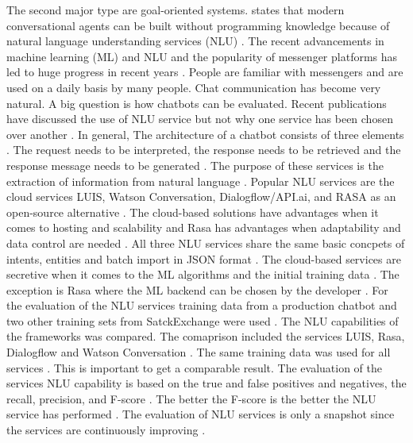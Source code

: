 The second major type are goal-oriented systems.
\citet{braunEvaluatingNLU} states that modern conversational agents can be built without programming 
knowledge because of natural language understanding services (NLU) \cite{braunEvaluatingNLU}. 
The recent advancements in machine learning (ML) and NLU and the popularity of messenger platforms 
has led to huge progress in recent years \cite{braunEvaluatingNLU}. 
People are familiar with messengers and are used on a daily basis by many people.
Chat communication has become very natural.
A big question is how chatbots can be evaluated.
Recent publications have discussed the use of NLU service but not why 
one service has been chosen over another \cite{braunEvaluatingNLU}.
In general, The architecture of a chatbot consists of three elements \cite{braunEvaluatingNLU}. 
The request needs to be interpreted, the response needs to be retrieved and the response message
needs to be generated \cite{braunEvaluatingNLU}. 
The purpose of these services is the extraction of information from natural language \cite{braunEvaluatingNLU}. 
Popular NLU services are the cloud services LUIS, Watson Conversation, Dialogflow/API.ai, and RASA as an open-source alternative \cite{braunEvaluatingNLU}. 
The cloud-based solutions have advantages when it comes to hosting and scalability and Rasa has advantages
when adaptability and data control are needed \cite{braunEvaluatingNLU}. 
All three NLU services share the same basic concpets of intents, entities and batch import in JSON format \cite{braunEvaluatingNLU}.
The cloud-based services are secretive when it comes to the ML algorithms and the initial training data \cite{braunEvaluatingNLU}. 
The exception is Rasa where the ML backend can be chosen by the developer \cite{braunEvaluatingNLU}. 
For the evaluation of the NLU services training data from a production chatbot and two other training sets 
from SatckExchange were used \cite{braunEvaluatingNLU}. 
The NLU capabilities of the frameworks was compared.
The comaprison included the services LUIS, Rasa, Dialogflow and Watson Conversation \cite{braunEvaluatingNLU}. 
The same training data was used for all services \cite{braunEvaluatingNLU}. 
This is important to get a comparable result.
The evaluation of the services NLU capability is based on the true and false positives and negatives, 
the recall, precision, and F-score \cite{braunEvaluatingNLU}. 
The better the F-score is the better the NLU service has performed \cite{braunEvaluatingNLU}. 
The evaluation of NLU services is only a snapshot since the services are continuously improving \cite{braunEvaluatingNLU}. 
